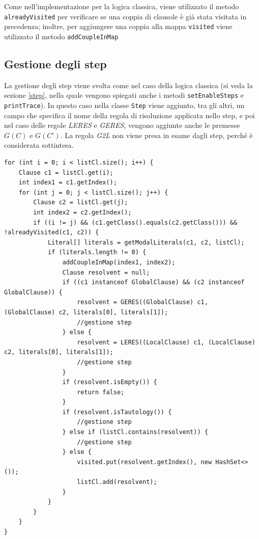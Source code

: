 \documentclass[a4paper,12pt]{report}
\begin{document}
Come nell'implementazione per la logica classica, viene utilizzato il metodo \\ \texttt{alreadyVisited} per verificare se una coppia di clausole è già stata visitata in precedenza; inoltre, per aggiungere una coppia alla mappa \texttt{visited} viene utilizzato il metodo \texttt{addCoupleInMap}

\subsection{Gestione degli step}
La gestione degli step viene svolta come nel caso della logica classica (si veda la sezione \ref{step}, nella quale vengono spiegati anche i metodi \texttt{setEnableSteps} e \texttt{printTrace}). In questo caso nella classe \texttt{Step} viene aggiunto, tra gli altri, un campo che specifica il nome della regola di risoluzione applicata nello step, e poi nel caso delle regole \emph{LERES} e \emph{GERES}, vengono aggiunte anche le premesse $G(C)$ e $G(C')$. La regola \emph{G2L} non viene presa in esame dagli step, perché è considerata sottintesa.

\begin{minipage}{\linewidth}
    \small
    \begin{lstlisting}[caption={cicli for innestati per l'esecuzione delle regole LERES e GERES nel metodo \texttt{isSatisfiable}}, label={method:isSatisfiable}]
for (int i = 0; i < listCl.size(); i++) {
    Clause c1 = listCl.get(i);
    int index1 = c1.getIndex();
    for (int j = 0; j < listCl.size(); j++) {
        Clause c2 = listCl.get(j);
        int index2 = c2.getIndex();
        if ((i != j) && (c1.getClass().equals(c2.getClass())) && !alreadyVisited(c1, c2)) {
            Literal[] literals = getModalLiterals(c1, c2, listCl);
            if (literals.length != 0) {
                addCoupleInMap(index1, index2);
                Clause resolvent = null;
                if ((c1 instanceof GlobalClause) && (c2 instanceof GlobalClause)) {
                    resolvent = GERES((GlobalClause) c1, (GlobalClause) c2, literals[0], literals[1]);
                    //gestione step
                } else {
                    resolvent = LERES((LocalClause) c1, (LocalClause) c2, literals[0], literals[1]);
                    //gestione step
                } 
                if (resolvent.isEmpty()) {
                    return false;
                }
                if (resolvent.isTautology()) {
                    //gestione step
                } else if (listCl.contains(resolvent)) {
                    //gestione step
                } else {
                    visited.put(resolvent.getIndex(), new HashSet<>());
                    listCl.add(resolvent);
                }
            }
        }
    }
}
    \end{lstlisting}
\end{minipage}
\end{document}
